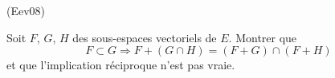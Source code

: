 \begin{tiny}(Eev08)\end{tiny}
Soit $F$, $G$, $H$ des sous-espaces vectoriels de $E$. Montrer que
\[
F\subset G\Rightarrow F+(G\cap H)=(F+G)\cap (F+H)
\]
et que l'implication r{\'e}ciproque n'est pas vraie.